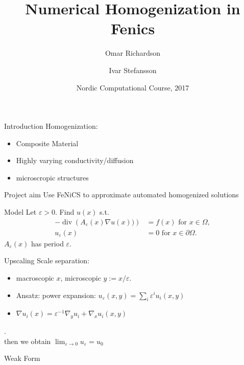 \documentclass{beamer}
\title[Numerical homogenization]{Numerical Homogenization in Fenics}
\author[O. Richardson \and I. Stefansson] %
{Omar Richardson \and Ivar Stefansson}
\institute %
{
    Karlstad University, Sweden \and University of Bergen, Norway
}
\date[]{Nordic Computational Course, 2017}
\renewcommand{\div}[1]{\operatorname{div}\left( #1 \right)}
\begin{document}
  \frame{\titlepage}
\begin{frame}{Introduction}
  Homogenization:
  \begin{itemize}
    \item Composite Material
    \item Highly varying conductivity/diffusion
    \item microscropic structures
  \end{itemize}
\end{frame}

\begin{frame}[t]{Project aim}
    Use FeNiCS to approximate automated homogenized solutions
\end{frame}

\begin{frame}[t]{Model}
    Let $\varepsilon>0$. Find $u(x)$ s.t.
    \begin{equation}
        \begin{split}
            -\div{A_\varepsilon(x)\nabla u(x))} &= f(x) \mbox{ for } x \in \Omega,\\
            u_\varepsilon(x) &= 0 \mbox{ for } x \in \partial\Omega.
        \end{split}
        \label{eq:model}
    \end{equation}
     $A_\varepsilon(x)$ has period $\varepsilon$.

\end{frame}

\begin{frame}[t]{Upscaling}
    Scale separation: \begin{itemize}
        \item macroscopic $ x$, microscopic $y:= x/\varepsilon$.
        \item Ansatz: power expansion: $u_\varepsilon(x,y) = \sum_i \varepsilon^i u_i(x,y)$
        \item $\nabla u_i(x) = \varepsilon^{-1}\nabla_yu_i + \nabla_xu_i(x,y)$
    \end{itemize}
    .\\
    then we obtain $\lim_{\varepsilon\to 0} u_\varepsilon = u_0$
\end{frame}



\begin{frame}[t]{Weak Form}

\end{frame}
\end{document}
